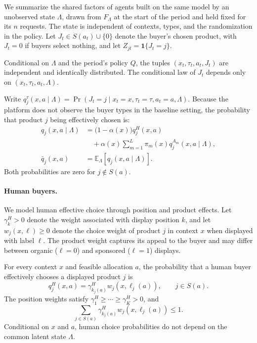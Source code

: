 \documentclass[opre,dblanonrev]{informs4}
\providecommand{\E}{\mathbb{E}}
\providecommand{\1}{\mathbf{1}}
\begin{document}
We summarize the shared factors of agents built on the same model by an unobserved state $\Lambda$, drawn from $F_\Lambda$ at the start of the period and held fixed for its $n$ requests. The state is independent of contexts, types, and the randomization in the policy. Let $J_t\in S(a_t)\cup\{0\}$ denote the buyer's chosen product, with $J_t=0$ if buyers select nothing, and let $Z_{jt}=\1\{J_t=j\}$.

\begin{assumption}\label{ass:cond-indep}
Conditional on $\Lambda$ and the period's policy $Q$, the tuples $(x_t,\tau_t,a_t,J_t)$ are independent and identically distributed. The conditional law of $J_t$ depends only on $(x_t,\tau_t,a_t,\Lambda)$.
\end{assumption}

Write $q_j^\tau(x,a\mid\Lambda)=\Pr(J_t=j\mid x_t=x,\tau_t=\tau,a_t=a,\Lambda)$. Because the platform does not observe the buyer types in the baseline setting, the probability that product $j$ being effectively chosen is:
\begin{equation}\label{eq:mixed-q}
\begin{aligned}
q_j(x,a\mid\Lambda)
  &=\bigl(1-\alpha(x)\bigr)q_j^H(x,a) \\
  &\quad +\alpha(x)\sum_{m=1}^{L}\pi_m(x)q_j^{A_m}(x,a\mid\Lambda),\\
\bar q_j(x,a)&=\E_\Lambda[q_j(x,a\mid\Lambda)].
\end{aligned}
\end{equation}
Both probabilities are zero for $j\notin S(a)$.

\paragraph{Human buyers.}
We model human effective choice through position and product effects.
Let $\gamma_k^H>0$ denote the weight associated with display position $k$, and let $w_j(x,\ell)\ge0$ denote the choice weight of product $j$ in context $x$ when displayed with label $\ell$. The product weight captures its appeal to the buyer and may differ between organic ($\ell=0$) and sponsored ($\ell=1$) displays.

\begin{assumption}\label{ass:human}
For every context $x$ and feasible allocation $a$, the probability that a human buyer effectively chooses a displayed product $j$ is
\[
q_j^H(x,a)
=
\gamma^H_{k_j(a)}w_j(x,\ell_j(a)),
\qquad j\in S(a).
\]
The position weights satisfy $\gamma_1^H\ge\cdots\ge\gamma_K^H>0$, and
\[
\sum_{j\in S(a)}
\gamma^H_{k_j(a)}w_j(x,\ell_j(a))\le1.
\]
Conditional on $x$ and $a$, human choice probabilities do not depend on the common latent state $\Lambda$.
\end{assumption}
\end{document}
